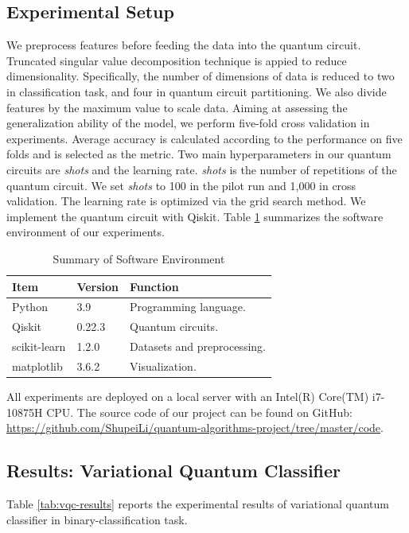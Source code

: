 \documentclass[sigconf]{acmart}
\begin{document}
\subsection{Experimental Setup}
We preprocess features before feeding the data into the quantum circuit. Truncated singular value decomposition technique is appied to reduce dimensionality. Specifically, the number of dimensions of data is reduced to two in classification task, and four in quantum circuit partitioning. We also divide features by the maximum value to scale data. Aiming at assessing the generalization ability of the model, we perform five-fold cross validation in experiments. Average accuracy is calculated according to the performance on five folds and is selected as the metric. Two main hyperparameters in our quantum circuits are \textit{shots} and the learning rate. \textit{shots} is the number of repetitions of the quantum circuit. We set \textit{shots} to 100 in the pilot run and 1,000 in cross validation. The learning rate is optimized via the grid search method. We implement the quantum circuit with Qiskit. Table \ref{tab:software} summarizes the software environment of our experiments.

\begin{table}[!ht]
    \centering
    \caption{Summary of Software Environment}
    \label{tab:software}
    \begin{tabular}{lll}
        \toprule
        \textbf{Item} & \textbf{Version} & \textbf{Function}\\
        \midrule
        Python & 3.9 & Programming language.\\
        Qiskit & 0.22.3 & Quantum circuits.\\
        scikit-learn & 1.2.0 & Datasets and preprocessing.\\
        matplotlib & 3.6.2 & Visualization.\\
        \bottomrule
    \end{tabular}
\end{table}

All experiments are deployed on a local server with an Intel(R) Core(TM) i7-10875H CPU. The source code of our project can be found on GitHub: \url{https://github.com/ShupeiLi/quantum-algorithms-project/tree/master/code}.

\subsection{Results: Variational Quantum Classifier}
Table \ref{tab:vqc-results} reports the experimental results of variational quantum classifier in binary-classification task.
\end{document}
